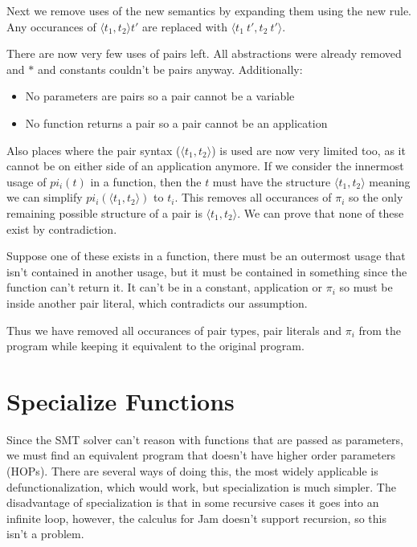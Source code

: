 \documentclass[12pt,a4paper,titlepage]{article}
\begin{document}
    Next we remove uses of the new semantics by expanding them using the new rule.
    Any occurances of $\langle t_1, t_2 \rangle t'$ are replaced with $\langle t_1\ t', t_2\ t' \rangle$.

    There are now very few uses of pairs left.
    All abstractions were already removed and $\ast$ and constants couldn't be pairs anyway.
    Additionally:
    \begin{itemize}
        \item No parameters are pairs so a pair cannot be a variable
        \item No function returns a pair so a pair cannot be an application
    \end{itemize}

    Also places where the pair syntax ($\langle t_1, t_2 \rangle$) is used are now very limited too, as
    it cannot be on either side of an application anymore.
    If we consider the innermost usage of $pi_i(t)$ in a function, then the $t$ must have the structure
    $\langle t_1, t_2 \rangle$ meaning we can simplify $pi_i(\langle t_1, t_2 \rangle)$ to $t_i$.
    This removes all occurances of $\pi_i$ so the only remaining possible structure of a pair is
    $\langle t_1, t_2 \rangle$. We can prove that none of these exist by contradiction.

    Suppose one of these exists in a function, there must be an outermost usage that isn't contained in another
    usage, but it must be contained in something since the function can't return it. It can't be in a constant,
    application or $\pi_i$ so must be inside another pair literal, which contradicts our assumption.

    Thus we have removed all occurances of pair types, pair literals and $\pi_i$ from the program while keeping
    it equivalent to the original program.

    \section{Specialize Functions}
    Since the SMT solver can't reason with functions that are passed as parameters, we must find an equivalent
    program that doesn't have higher order parameters (HOPs).
    There are several ways of doing this, the most widely applicable is defunctionalization, which would work,
    but specialization is much simpler.
    The disadvantage of specialization is that in some recursive cases it goes into an infinite loop, however,
    the calculus for Jam doesn't support recursion, so this isn't a problem.
\end{document}
